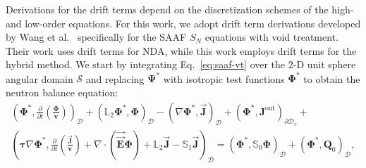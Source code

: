 Derivations for the drift terms depend on the discretization schemes of the high- and low-order
equations. For this work, we adopt drift term derivations developed by Wang et al.\
\cite{wang_diffusion_2014, wang_rattlesnake_2018} specifically for the \gls{SAAF} $S_N$ equations
with void treatment. Their work uses drift terms for \gls{NDA}, while this work employs drift terms
for the hybrid method. We start by integrating Eq.\ \ref{eq:saaf-vt}
over the 2-D unit sphere angular domain $\mathcal{S}$ and replacing $\bm{\Psi}^*$ with isotropic
test functions $\bm{\Phi}^*$ to obtain the neutron balance equation:
%
\begin{multline}
  \left(\bm{\Phi}^*,\frac{\partial}{\partial t}\left(\frac{\bm{\Phi}}{\bm{v}}\right)\right)_\mathcal{D}
  + \left(\mathbb{L}_2\bm{\Phi}^*,\bm{\Phi}\right)_\mathcal{D}
  - \left(\nabla\bm{\Phi}^*,\vec{\bm{J}}\right)_\mathcal{D}
  + \left(\bm{\Phi}^*,\bm{J}^\text{out}\right)_{\partial\mathcal{D}_v} + \\
  \left(\bm{\tau}\nabla\bm{\Phi}^*, \frac{\partial}{\partial t}\left(\frac{\vec{\bm{J}}}{\bm{v}}\right)
    + \nabla\cdot(\vec{\vec{\bm{E}}}\bm{\Phi}) +\mathbb{L}_2\vec{\bm{J}} -
    \mathbb{S}_1\vec{\bm{J}}\right)_\mathcal{D}
  = \left(\bm{\Phi}^*,\mathbb{S}_0\bm{\Phi}\right)_\mathcal{D}
  + \left(\bm{\Phi}^*,\bm{Q}_0\right)_\mathcal{D},
\end{multline}
%
